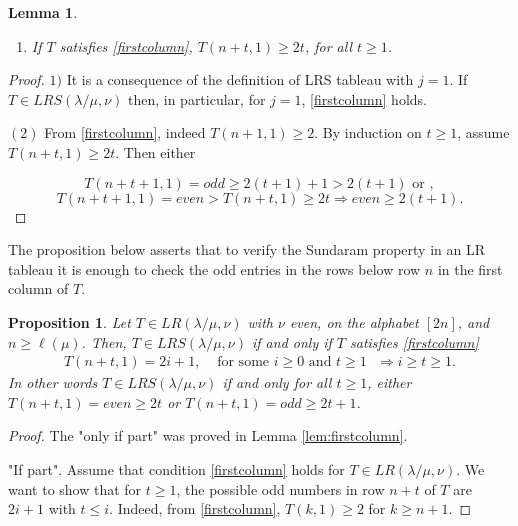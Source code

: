 \documentclass[reqno]{amsart}
\theoremstyle{tplain}
\newtheorem{lem}{Lemma}
\newtheorem{prop}{Proposition}
\begin{document}
{\begin{lem}
\begin{enumerate}
\item If $T$ satisfies \eqref{firstcolumn},  $T(n+t,1)\ge 2t$, for all $t\ge 1$.
\end{enumerate}
\end{lem}
\begin{proof} $1)$  It is a consequence of the definition of LRS tableau with $j=1$. If $T\in LRS(\lambda/\mu,\nu)$ then, in particular, for $j=1$, \eqref{firstcolumn} holds.

$(2)$ From \eqref{firstcolumn}, indeed $T(n+1,1)\ge 2$. By  induction on  $t\ge 1$, assume $T(n+t,1)\ge 2t$. Then     either

$$T(n+t+1,1)=odd\ge 2(t+1)+1>2(t+1) \mbox{ or },$$
$$T(n+t+1,1)=even>T(n+t,1)\ge 2t\Rightarrow even\ge 2(t+1).$$
\end{proof}

The proposition below asserts that to verify the Sundaram property in an LR tableau  it is enough to check the odd entries in the rows below row $n$ in the first column of $T$.
\begin{prop}Let $T\in LR(\lambda/\mu,\nu)$ with $\nu$ even, on the alphabet $[2n]$, and $n\ge \ell(\mu)$.  Then, $T\in LRS(\lambda/\mu,\nu)$ if and only if $T$ satisfies \eqref{firstcolumn}
\begin{align}
T(n+t,1)=2i+1, &\mbox{ for some $i\ge 0$ and $t\ge 1$ }\Rightarrow i\ge t\ge 1.\nonumber %
\end{align}
  In other words $T\in LRS(\lambda/\mu,\nu)$ if and only  for all $t\ge 1$, either $T(n+t,1)=even\ge 2t$ or $T(n+t,1)=odd\ge 2t+1$.
\end{prop}

\begin{proof} The  "only if part" was proved in Lemma \ref{lem:firstcolumn}.

"If part". Assume that condition \eqref{firstcolumn} holds for $T\in LR(\lambda/\mu, \nu)$. We want to show that for $t\ge 1$, the  possible odd numbers in row $n+t$ of $T$ are $2i+1$ with  $t\le i$. Indeed, from \eqref{firstcolumn}, $T(k,1)\ge 2$ for $k\ge n+1$.


\end{proof}}
\end{document}
